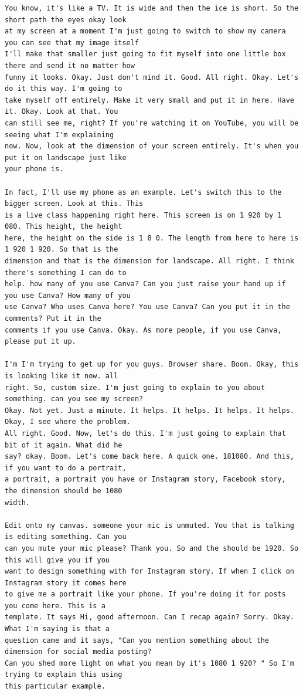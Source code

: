 {\begin{Verbatim}
You know, it's like a TV. It is wide and then the ice is short. So the short path the eyes okay look
at my screen at a moment I'm just going to switch to show my camera you can see that my image itself
I'll make that smaller just going to fit myself into one little box there and send it no matter how
funny it looks. Okay. Just don't mind it. Good. All right. Okay. Let's do it this way. I'm going to
take myself off entirely. Make it very small and put it in here. Have it. Okay. Look at that. You
can still see me, right? If you're watching it on YouTube, you will be seeing what I'm explaining
now. Now, look at the dimension of your screen entirely. It's when you put it on landscape just like
your phone is.

In fact, I'll use my phone as an example. Let's switch this to the bigger screen. Look at this. This
is a live class happening right here. This screen is on 1 920 by 1 080. This height, the height
here, the height on the side is 1 8 0. The length from here to here is 1 920 1 920. So that is the
dimension and that is the dimension for landscape. All right. I think there's something I can do to
help. how many of you use Canva? Can you just raise your hand up if you use Canva? How many of you
use Canva? Who uses Canva here? You use Canva? Can you put it in the comments? Put it in the
comments if you use Canva. Okay. As more people, if you use Canva, please put it up.

I'm I'm trying to get up for you guys. Browser share. Boom. Okay, this is looking like it now. all
right. So, custom size. I'm just going to explain to you about something. can you see my screen?
Okay. Not yet. Just a minute. It helps. It helps. It helps. It helps. Okay, I see where the problem.
All right. Good. Now, let's do this. I'm just going to explain that bit of it again. What did he
say? okay. Boom. Let's come back here. A quick one. 181080. And this, if you want to do a portrait,
a portrait, a portrait you have or Instagram story, Facebook story, the dimension should be 1080
width.

Edit onto my canvas. someone your mic is unmuted. You that is talking is editing something. Can you
can you mute your mic please? Thank you. So and the should be 1920. So this will give you if you
want to design something with for Instagram story. If when I click on Instagram story it comes here
to give me a portrait like your phone. If you're doing it for posts you come here. This is a
template. It says Hi, good afternoon. Can I recap again? Sorry. Okay. What I'm saying is that a
question came and it says, "Can you mention something about the dimension for social media posting?
Can you shed more light on what you mean by it's 1080 1 920? " So I'm trying to explain this using
this particular example.


\end{Verbatim}}
